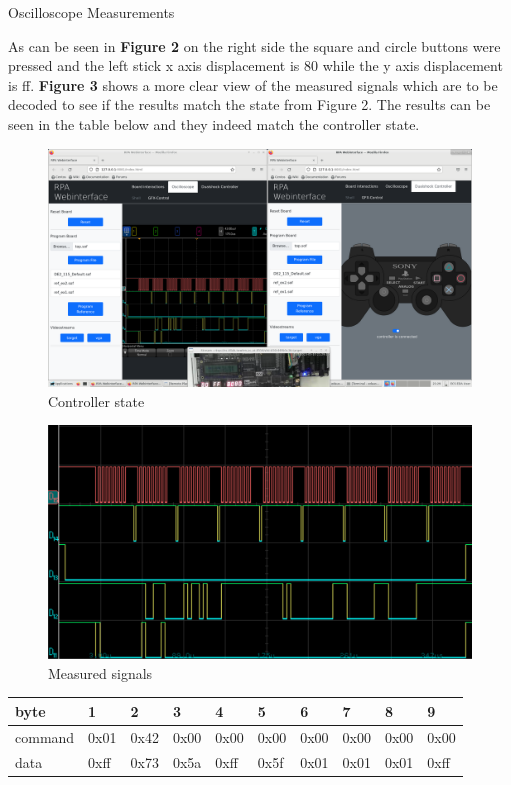 \documentclass[10pt,a4paper,titlepage,oneside]{article}
\begin{document}
\begin{qa}{Oscilloscope Measurements}

	As can be seen in \textbf{Figure 2} on the right side the square and circle buttons were pressed and the left stick x axis displacement is 80 while the y axis displacement is ff.
	\textbf{Figure 3} shows a more clear view of the measured signals which are to be decoded to see if the results match the state from Figure 2. The results can be seen in the table below
	and they indeed match the controller state.

	\begin{figure}[h!]
		\centering
		\includegraphics[width=0.75\linewidth]{complete.png}
		\caption{Controller state}
	\end{figure}

	\begin{figure}[h!]
		\centering
		\includegraphics[width=0.75\linewidth]{zoomed.png}
		\caption{Measured signals}
	\end{figure}

	\begin{center}

	\begin{center}
	\ttfamily
	\begin{tabular}{|l|l|l|l|l|l|l|l|l|l|}
	\hline
	byte    & 1    & 2    & 3    & 4     & 5     & 6     & 7     & 8     & 9    \\ \hline
	command & 0x01 & 0x42 & 0x00 & 0x00  & 0x00  & 0x00  & 0x00  & 0x00  & 0x00 \\ \hline
	data    & 0xff & 0x73 & 0x5a & 0xff  & 0x5f  & 0x01  & 0x01  & 0x01  & 0xff \\ \hline
	\end{tabular}
	\end{center}
	\end{center}

\end{qa}
\end{document}
